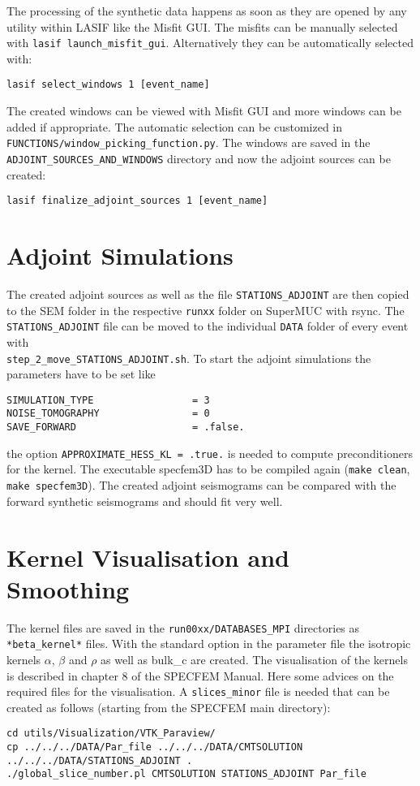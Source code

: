The processing of the synthetic data happens as soon as they are opened
by any utility within LASIF like the Misfit GUI.
The misfits can be manually selected with \texttt{lasif launch\_misfit\_gui}.
Alternatively they can be automatically selected with:
\begin{lstlisting} 
lasif select_windows 1 [event_name]
\end{lstlisting}
The created windows can be viewed with Misfit GUI and more windows can be added
if appropriate.
The automatic selection can be customized in \\ \texttt{FUNCTIONS/window\_picking\_function.py}. 
The windows are saved in the \\
\texttt{ADJOINT\_SOURCES\_AND\_WINDOWS} directory
and now the adjoint sources can be created:
\begin{lstlisting} 
lasif finalize_adjoint_sources 1 [event_name]
\end{lstlisting}

\section{Adjoint Simulations}
The created adjoint sources as well as the file \texttt{STATIONS\_ADJOINT} 
are then copied to the SEM folder in the respective \texttt{runxx} folder 
on SuperMUC with rsync. 
The \texttt{STATIONS\_ADJOINT} file can be moved to the individual 
\texttt{DATA} folder of every event with\\ \texttt{step\_2\_move\_STATIONS\_ADJOINT.sh}.
To start the adjoint simulations the parameters have to be set like
\begin{lstlisting} 
SIMULATION_TYPE                 = 3        
NOISE_TOMOGRAPHY                = 0        
SAVE_FORWARD                    = .false.   
\end{lstlisting}

the option \texttt{APPROXIMATE\_HESS\_KL = .true.} is needed to compute 
preconditioners for the kernel.
The executable specfem3D has to be compiled again (\texttt{make clean}, \texttt{make specfem3D}).
The created adjoint seismograms can be compared with the forward synthetic
seismograms and should fit very well.


\section{Kernel Visualisation and Smoothing}

The kernel files are saved in the \texttt{run00xx/DATABASES\_MPI} directories
as \texttt{*beta\_kernel*} files. 
With the standard option in the parameter file the isotropic kernels
$\alpha$, $\beta$ and $\rho$ as well as bulk\_c are created.
The visualisation of the kernels is described in chapter 8 of the 
SPECFEM Manual. Here some advices on the required files for the visualisation.
A \texttt{slices\_minor} file is needed that can be created as follows
(starting from the SPECFEM main directory):
\begin{lstlisting} 
cd utils/Visualization/VTK_Paraview/
cp ../../../DATA/Par_file ../../../DATA/CMTSOLUTION ../../../DATA/STATIONS_ADJOINT .
./global_slice_number.pl CMTSOLUTION STATIONS_ADJOINT Par_file
\end{lstlisting}

